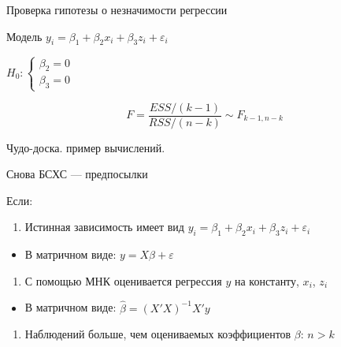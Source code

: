 \documentclass[ignorenonframetext,]{beamer}
\begin{document}
\begin{frame}{Проверка гипотезы о незначимости регрессии}

Модель $y_i = \beta_1 + \beta_2 x_i + \beta_3 z_i + \varepsilon_i$

$H_0: \begin{cases} \beta_2 =0 \\ \beta_3 = 0 \end{cases}$

\[
F=\frac{ESS/(k-1)}{RSS/(n-k)} \sim F_{k-1, n-k}
\]

\end{frame}

\begin{frame}{Чудо-доска. пример вычислений.}

\end{frame}

\begin{frame}{Снова БСХС --- предпосылки}

Если:

\begin{enumerate}
\def\labelenumi{\arabic{enumi}.}
\itemsep1pt\parskip0pt
\item
  Истинная зависимость имеет вид
  $y_i=\beta_1 + \beta_2 x_i + \beta_3 z_i+\varepsilon_i$
\end{enumerate}

\begin{itemize}
\itemsep1pt\parskip0pt
\item
  В матричном виде: $y=X\beta + \varepsilon$
\end{itemize}

\begin{enumerate}
\def\labelenumi{\arabic{enumi}.}
\setcounter{enumi}{1}
\itemsep1pt\parskip0pt
\item
  С помощью МНК оценивается регрессия $y$ на константу, $x_i$, $z_i$
\end{enumerate}

\begin{itemize}
\itemsep1pt\parskip0pt
\item
  В матричном виде: $\hat{\beta}=(X'X)^{-1}X'y$
\end{itemize}

\begin{enumerate}
\def\labelenumi{\arabic{enumi}.}
\setcounter{enumi}{2}
\itemsep1pt\parskip0pt
\item
  Наблюдений больше, чем оцениваемых коэффициентов $\beta$: $n>k$
\end{enumerate}

\end{frame}
\end{document}
